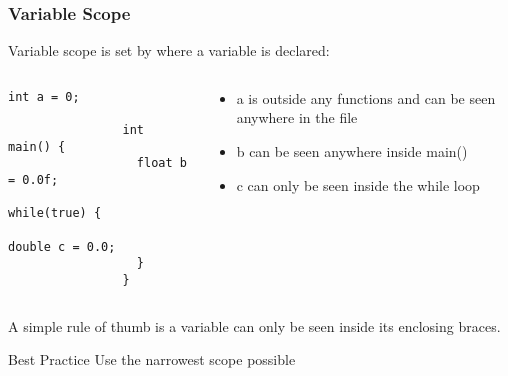 \begin{frame}[fragile]
	\frametitle{Variable Scope}
	Variable scope is set by where a variable is declared:
	\begin{columns}[c]
		\begin{column}{0.5\textwidth}
			\begin{lstlisting}[numbers=none]
				int a = 0;
				
				int main() {
				  float b = 0.0f;
				  while(true) {
				    double c = 0.0;
				  }
				}
			\end{lstlisting}
		\end{column}
		\begin{column}{0.5\textwidth}
			\begin{itemize}
				\item a is outside any functions and can be seen anywhere in the file
				\item b can be seen anywhere inside main()
				\item c can only be seen inside the while loop
			\end{itemize}
		\end{column}
	\end{columns}
	A simple rule of thumb is a variable can only be seen inside its enclosing braces.
	\begin{block}{Best Practice}
		Use the narrowest scope possible
	\end{block}
\end{frame}

